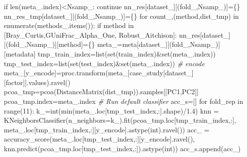 \documentclass[
]{article}
\newenvironment{Shaded}{}{}
\newcommand{\BuiltInTok}[1]{\textcolor[rgb]{0.65,0.15,0.64}{#1}}
\newcommand{\CommentTok}[1]{\textcolor[rgb]{0.63,0.63,0.65}{\textit{#1}}}
\newcommand{\ControlFlowTok}[1]{\textcolor[rgb]{0.65,0.15,0.64}{#1}}
\newcommand{\DecValTok}[1]{\textcolor[rgb]{0.60,0.41,0.00}{#1}}
\newcommand{\FloatTok}[1]{\textcolor[rgb]{0.60,0.41,0.00}{#1}}
\newcommand{\KeywordTok}[1]{\textcolor[rgb]{0.65,0.15,0.64}{#1}}
\newcommand{\NormalTok}[1]{\textcolor[rgb]{0.22,0.23,0.26}{#1}}
\newcommand{\OperatorTok}[1]{\textcolor[rgb]{0.65,0.15,0.64}{#1}}
\newcommand{\StringTok}[1]{\textcolor[rgb]{0.31,0.63,0.31}{#1}}
\begin{document}
\begin{Shaded}
\begin{Highlighting}[numbers=left,,firstnumber=123,]
    \ControlFlowTok{if} \BuiltInTok{len}\NormalTok{(meta\_.index)}\OperatorTok{\textless{}}\NormalTok{Nsamp\_:}
        \ControlFlowTok{continue} 
\NormalTok{    nn\_res[dataset\_][(fold\_,Nsamp\_)]}\OperatorTok{=}\NormalTok{\{\}}
\NormalTok{    nn\_res\_tmp[dataset\_][(fold\_,Nsamp\_)]}\OperatorTok{=}\NormalTok{\{\}}
    \ControlFlowTok{for}\NormalTok{ count\_,(method,dist\_tmp) }\KeywordTok{in} \BuiltInTok{enumerate}\NormalTok{(methods\_.items()):}
      \ControlFlowTok{if}\NormalTok{ method }\KeywordTok{in}\NormalTok{ [}\StringTok{\textquotesingle{}Bray\_Curtis\textquotesingle{}}\NormalTok{,}\StringTok{\textquotesingle{}GUniFrac\_Alpha\_One\textquotesingle{}}\NormalTok{, }\StringTok{\textquotesingle{}Robust\_Aitchison\textquotesingle{}}\NormalTok{]:}
\NormalTok{        nn\_res[dataset\_][(fold\_,Nsamp\_)][method]}\OperatorTok{=}\NormalTok{\{\}}
\NormalTok{        meta\_}\OperatorTok{=}\NormalTok{meta[dataset\_][(fold\_,Nsamp\_)][}\StringTok{\textquotesingle{}metadata\textquotesingle{}}\NormalTok{]}
\NormalTok{        tmp\_train\_index}\OperatorTok{=}\BuiltInTok{list}\NormalTok{(}\BuiltInTok{set}\NormalTok{(train\_index)}\OperatorTok{\&}\BuiltInTok{set}\NormalTok{(meta\_.index))}
\NormalTok{        tmp\_test\_index}\OperatorTok{=}\BuiltInTok{list}\NormalTok{(}\BuiltInTok{set}\NormalTok{(test\_index)}\OperatorTok{\&}\BuiltInTok{set}\NormalTok{(meta\_.index))}
        \CommentTok{\# encode }
\NormalTok{        meta\_[}\StringTok{\textquotesingle{}y\_encode\textquotesingle{}}\NormalTok{]}\OperatorTok{=}\NormalTok{proc.transform(meta\_[case\_study[dataset\_][}\StringTok{\textquotesingle{}factor\textquotesingle{}}\NormalTok{]].values).ravel()}
\NormalTok{        pcoa\_tmp}\OperatorTok{=}\NormalTok{pcoa(DistanceMatrix(dist\_tmp)).samples[[}\StringTok{\textquotesingle{}PC1\textquotesingle{}}\NormalTok{,}\StringTok{\textquotesingle{}PC2\textquotesingle{}}\NormalTok{]]}
\NormalTok{        pcoa\_tmp.index}\OperatorTok{=}\NormalTok{meta\_.index}
        \CommentTok{\# Run default classifier }
\NormalTok{        acc\_s}\OperatorTok{=}\NormalTok{[]}
        \ControlFlowTok{for}\NormalTok{ fold\_rep }\KeywordTok{in} \BuiltInTok{range}\NormalTok{(}\DecValTok{11}\NormalTok{):}
\NormalTok{          k\_}\OperatorTok{=}\BuiltInTok{int}\NormalTok{(}\BuiltInTok{min}\NormalTok{(meta\_.loc[tmp\_test\_index,:].shape)}\OperatorTok{/}\FloatTok{1.4}\NormalTok{)}
\NormalTok{          knn }\OperatorTok{=}\NormalTok{ KNeighborsClassifier(n\_neighbors}\OperatorTok{=}\NormalTok{k\_).fit(pcoa\_tmp.loc[tmp\_train\_index,:], }
\NormalTok{                                          meta\_.loc[tmp\_train\_index,:][}\StringTok{\textquotesingle{}y\_encode\textquotesingle{}}\NormalTok{].astype(}\BuiltInTok{int}\NormalTok{).ravel())}
\NormalTok{          acc\_ }\OperatorTok{=}\NormalTok{ accuracy\_score(meta\_.loc[tmp\_test\_index,:][}\StringTok{\textquotesingle{}y\_encode\textquotesingle{}}\NormalTok{].ravel(),}
\NormalTok{                              knn.predict(pcoa\_tmp.loc[tmp\_test\_index,:]).astype(}\BuiltInTok{int}\NormalTok{))}
\NormalTok{          acc\_s.append(acc\_)}


\end{Highlighting}
\end{Shaded}
\end{document}
